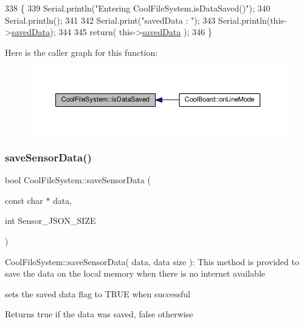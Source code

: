 \begin{DoxyCode}
338 \{
339     Serial.println(\textcolor{stringliteral}{"Entering CoolFileSystem.isDataSaved()"});
340     Serial.println();
341     
342     Serial.print(\textcolor{stringliteral}{"savedData : "});
343     Serial.println(this->\hyperlink{classCoolFileSystem_ad398e0c5c41a0c88acdf5d672aa71351}{savedData});
344 
345     \textcolor{keywordflow}{return}( this->\hyperlink{classCoolFileSystem_ad398e0c5c41a0c88acdf5d672aa71351}{savedData} );
346 \}
\end{DoxyCode}
Here is the caller graph for this function\+:\nopagebreak
\begin{figure}[H]
\begin{center}
\leavevmode
\includegraphics[width=350pt]{classCoolFileSystem_a5a7eaeea7a9fbf8aaef651d862fa3b5b_icgraph}
\end{center}
\end{figure}
\mbox{\label{classCoolFileSystem_a4c560c2ddd40b74b7758e6ceb2c58957}} 
\subsubsection{\texorpdfstring{save\+Sensor\+Data()}{saveSensorData()}}
{\footnotesize\ttfamily bool Cool\+File\+System\+::save\+Sensor\+Data (\begin{DoxyParamCaption}\item[{const char $\ast$}]{data,  }\item[{int}]{Sensor\+\_\+\+J\+S\+O\+N\+\_\+\+S\+I\+ZE }\end{DoxyParamCaption})}

Cool\+File\+System\+::save\+Sensor\+Data( data, data size )\+: This method is provided to save the data on the local memory when there is no internet available

sets the saved data flag to T\+R\+UE when successful

\begin{DoxyReturn}{Returns}
true if the data was saved, false otherwise 
\end{DoxyReturn}


